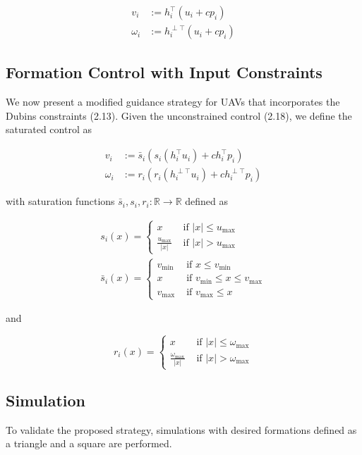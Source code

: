 \documentclass[10pt]{article}
\begin{document}
$$
\begin{aligned}
v_{i} & :=h_{i}^{\top}\left(u_{i}+c p_{i}\right) \\
\omega_{i} & :=h_{i}^{\perp \top}\left(u_{i}+c p_{i}\right)
\end{aligned}
$$

\subsection{Formation Control with Input Constraints}
We now present a modified guidance strategy for UAVs that incorporates the Dubins constraints (2.13). Given the unconstrained control (2.18), we define the saturated control as

$$
\begin{aligned}
v_{i} & :=\bar{s}_{i}\left(s_{i}\left(h_{i}^{\top} u_{i}\right)+c h_{i}^{\top} p_{i}\right) \\
\omega_{i} & :=r_{i}\left(r_{i}\left(h_{i}^{\perp \top} u_{i}\right)+c h_{i}^{\perp \top} p_{i}\right)
\end{aligned}
$$

with saturation functions $\bar{s}_{i}, s_{i}, r_{i}: \mathbb{R} \rightarrow \mathbb{R}$ defined as

$$
\begin{gathered}
s_{i}(x)= \begin{cases}x & \text { if }|x| \leq u_{\max } \\
\frac{u_{\max }}{|x|} & \text { if }|x|>u_{\max }\end{cases} \\
\bar{s}_{i}(x)= \begin{cases}v_{\min } & \text { if } x \leq v_{\min } \\
x & \text { if } v_{\min } \leq x \leq v_{\max } \\
v_{\max } & \text { if } v_{\max } \leq x\end{cases}
\end{gathered}
$$

and

$$
r_{i}(x)= \begin{cases}x & \text { if }|x| \leq \omega_{\max } \\ \frac{\omega_{\max }}{|x|} & \text { if }|x|>\omega_{\max }\end{cases}
$$

\subsection{Simulation}
To validate the proposed strategy, simulations with desired formations defined as a triangle and a square are performed.
\end{document}

